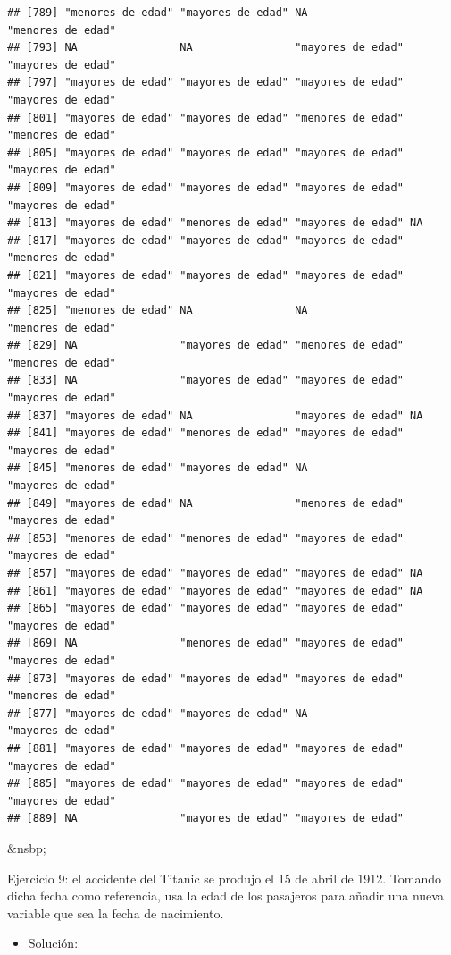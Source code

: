 \documentclass[11pt,]{book}
\providecommand{\tightlist}{%
  \setlength{\itemsep}{0pt}\setlength{\parskip}{0pt}}
\begin{document}
\begin{verbatim}
## [789] "menores de edad" "mayores de edad" NA                "menores de edad"
## [793] NA                NA                "mayores de edad" "mayores de edad"
## [797] "mayores de edad" "mayores de edad" "mayores de edad" "mayores de edad"
## [801] "mayores de edad" "mayores de edad" "menores de edad" "menores de edad"
## [805] "mayores de edad" "mayores de edad" "mayores de edad" "mayores de edad"
## [809] "mayores de edad" "mayores de edad" "mayores de edad" "mayores de edad"
## [813] "mayores de edad" "menores de edad" "mayores de edad" NA               
## [817] "mayores de edad" "mayores de edad" "mayores de edad" "menores de edad"
## [821] "mayores de edad" "mayores de edad" "mayores de edad" "mayores de edad"
## [825] "menores de edad" NA                NA                "menores de edad"
## [829] NA                "mayores de edad" "menores de edad" "menores de edad"
## [833] NA                "mayores de edad" "mayores de edad" "mayores de edad"
## [837] "mayores de edad" NA                "mayores de edad" NA               
## [841] "mayores de edad" "menores de edad" "mayores de edad" "mayores de edad"
## [845] "menores de edad" "mayores de edad" NA                "mayores de edad"
## [849] "mayores de edad" NA                "menores de edad" "mayores de edad"
## [853] "menores de edad" "menores de edad" "mayores de edad" "mayores de edad"
## [857] "mayores de edad" "mayores de edad" "mayores de edad" NA               
## [861] "mayores de edad" "mayores de edad" "mayores de edad" NA               
## [865] "mayores de edad" "mayores de edad" "mayores de edad" "mayores de edad"
## [869] NA                "menores de edad" "mayores de edad" "mayores de edad"
## [873] "mayores de edad" "mayores de edad" "mayores de edad" "menores de edad"
## [877] "mayores de edad" "mayores de edad" NA                "mayores de edad"
## [881] "mayores de edad" "mayores de edad" "mayores de edad" "mayores de edad"
## [885] "mayores de edad" "mayores de edad" "mayores de edad" "mayores de edad"
## [889] NA                "mayores de edad" "mayores de edad"
\end{verbatim}

\&nsbp;

Ejercicio 9: el accidente del Titanic se produjo el 15 de abril de 1912. Tomando dicha fecha como referencia, usa la edad de los pasajeros para añadir una nueva variable que sea la fecha de nacimiento.

\begin{itemize}
\tightlist
\item
  Solución:
\end{itemize}
\end{document}

